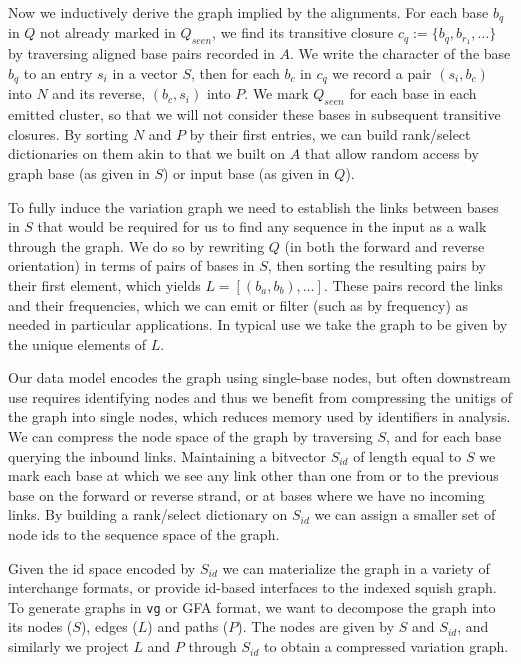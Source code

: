 \documentclass{bioinfo}
\begin{document}
    Now we inductively derive the graph implied by the alignments.
    For each base $b_{q}$ in $Q$ not already marked in $Q_{seen}$, we find its transitive closure $c_{q} := \{b_{q}, b_{r_{1}}, \ldots \}$ by traversing aligned base pairs recorded in $A$.
    We write the character of the base $b_{q}$ to an entry $s_i$ in a vector $S$, then for each $b_{c}$ in $c_{q}$ we record a pair $(s_{i}, b_{c})$ into $N$ and its reverse, $(b_{c}, s_{i})$ into $P$.
    We mark $Q_{seen}$ for each base in each emitted cluster, so that we will not consider these bases in subsequent transitive closures.
    By sorting $N$ and $P$ by their first entries, we can build rank/select dictionaries on them akin to that we built on $A$ that allow random access by graph base (as given in $S$) or input base (as given in $Q$).

    To fully induce the variation graph we need to establish the links between bases in $S$ that would be required for us to find any sequence in the input as a walk through the graph.
    We do so by rewriting $Q$ (in both the forward and reverse orientation) in terms of pairs of bases in $S$, then sorting the resulting pairs by their first element, which yields $L = [(b_{a}, b_{b}), \ldots ]$.
    These pairs record the links and their frequencies, which we can emit or filter (such as by frequency) as needed in particular applications.
    In typical use we take the graph to be given by the unique elements of $L$.

    Our data model encodes the graph using single-base nodes, but often downstream use requires identifying nodes and thus we benefit from compressing the unitigs of the graph into single nodes, which reduces memory used by identifiers in analysis.
    We can compress the node space of the graph by traversing $S$, and for each base querying the inbound links.
    Maintaining a bitvector $S_{id}$ of length equal to $S$ we mark each base at which we see any link other than one from or to the previous base on the forward or reverse strand, or at bases where we have no incoming links.
    By building a rank/select dictionary on $S_{id}$ we can assign a smaller set of node ids to the sequence space of the graph.

    Given the id space encoded by $S_{id}$ we can materialize the graph in a variety of interchange formats, or provide id-based interfaces to the indexed squish graph.
    To generate graphs in \texttt {vg} or GFA format, we want to decompose the graph into its nodes ($S$), edges ($L$) and paths ($P$).
    The nodes are given by $S$ and $S_{id}$, and similarly we project $L$ and $P$ through $S_{id}$ to obtain a compressed variation graph.
\end{document}
